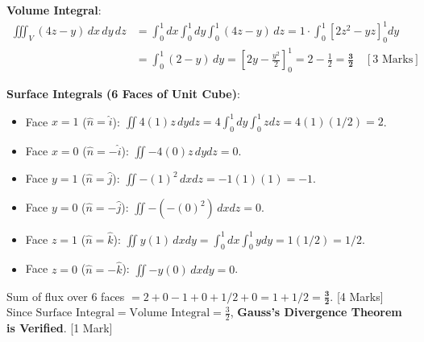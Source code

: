 \begin{solutionbox}
\begin{enumerate}[start=8]
    \textbf{Volume Integral}:
    \begin{align*}
        \iiint_V (4z - y)\,dx\,dy\,dz &= \int_0^1 dx \int_0^1 dy \int_0^1 (4z - y)\,dz = 1 \cdot \int_0^1 \left[ 2z^2 - yz \right]_0^1 dy \\
        &= \int_0^1 (2 - y)\,dy = \left[ 2y - \frac{y^2}{2} \right]_0^1 = 2 - \frac{1}{2} = \mathbf{\frac{3}{2}} \quad [3\text{ Marks}]
    \end{align*}

    \textbf{Surface Integrals (6 Faces of Unit Cube)}:
    \begin{itemize}
        \item Face $x = 1$ ($\hat{n} = \hat{i}$): $\iint 4(1)z\,dy dz = 4 \int_0^1 dy \int_0^1 z dz = 4(1)(1/2) = 2$.
        \item Face $x = 0$ ($\hat{n} = -\hat{i}$): $\iint -4(0)z\,dy dz = 0$.
        \item Face $y = 1$ ($\hat{n} = \hat{j}$): $\iint -(1)^2\,dx dz = -1(1)(1) = -1$.
        \item Face $y = 0$ ($\hat{n} = -\hat{j}$): $\iint -(-(0)^2)\,dx dz = 0$.
        \item Face $z = 1$ ($\hat{n} = \hat{k}$): $\iint y(1)\,dx dy = \int_0^1 dx \int_0^1 y dy = 1(1/2) = 1/2$.
        \item Face $z = 0$ ($\hat{n} = -\hat{k}$): $\iint -y(0)\,dx dy = 0$.
    \end{itemize}
    Sum of flux over 6 faces $= 2 + 0 - 1 + 0 + 1/2 + 0 = 1 + 1/2 = \mathbf{\frac{3}{2}}$. [4 Marks]
    Since $\text{Surface Integral} = \text{Volume Integral} = \frac{3}{2}$, \textbf{Gauss's Divergence Theorem is Verified}. [1 Mark]
\end{enumerate}
\end{solutionbox}
